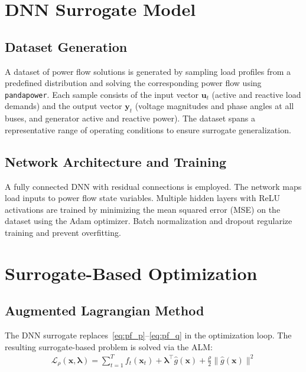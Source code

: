 \documentclass[journal]{IEEEtran}
\begin{document}
\section{DNN Surrogate Model}
\label{sec:surrogate}

\subsection{Dataset Generation}

A dataset of power flow solutions is generated by sampling load profiles from a
predefined distribution and solving the corresponding power flow using
\texttt{pandapower}. Each sample consists of the input vector $\mathbf{u}_t$
(active and reactive load demands) and the output vector $\mathbf{y}_t$ (voltage
magnitudes and phase angles at all buses, and generator active and reactive power).
The dataset spans a representative range of operating conditions to ensure
surrogate generalization.

\subsection{Network Architecture and Training}

A fully connected DNN with residual connections is employed. The network maps
load inputs to power flow state variables. Multiple hidden layers with ReLU
activations are trained by minimizing the mean squared error (MSE) on the dataset
using the Adam optimizer. Batch normalization and dropout regularize training
and prevent overfitting.

\section{Surrogate-Based Optimization}
\label{sec:optimization}

\subsection{Augmented Lagrangian Method}

The DNN surrogate replaces~\eqref{eq:pf_p}--\eqref{eq:pf_q} in the optimization
loop. The resulting surrogate-based problem is solved via the ALM:
\begin{align}
  \mathcal{L}_\rho(\mathbf{x}, \bm{\lambda})
    = \sum_{t=1}^{T} f_t(\mathbf{x}_t)
    + \bm{\lambda}^\top \hat{g}(\mathbf{x})
    + \frac{\rho}{2} \|\hat{g}(\mathbf{x})\|^2
\end{align}
\end{document}
